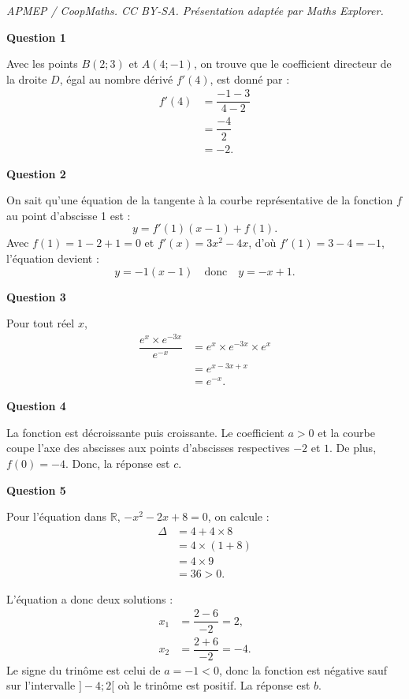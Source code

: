 \documentclass[10pt]{article}
\begin{document}
\noindent\textit{APMEP / CoopMaths. CC BY-SA. Présentation adaptée par Maths Explorer.}\par\medskip
\textbf{Question 1}
	
	Avec les points $B(2; 3)$ et $A(4; -1)$, on trouve que le coefficient directeur de la droite $D$, égal au nombre dérivé $f'(4)$, est donné par : 
	\begin{align*}
		f'(4) &= \dfrac{-1-3}{4-2} \\
		&= \dfrac{-4}{2} \\
		&= -2.
	\end{align*}
	
	\textbf{Question 2}
	
	On sait qu'une équation de la tangente à la courbe représentative de la fonction $f$ au point d'abscisse 1 est : 
	\[
	y  = f'(1)(x - 1)+f(1).
	\]
	Avec $f(1) = 1-2+1 = 0$ et $f'(x) = 3x^2 - 4x$, d'où $f'(1) = 3-4 = -1$, l'équation devient :
	\[
	y  = -1(x - 1) \quad \text{donc} \quad y = -x + 1.
	\]
	
	\textbf{Question 3}
	
	Pour tout réel $x$, 
	\begin{align*}
		\dfrac{e^x \times e^{-3x}}{e^{-x}} &= e^x \times e^{-3x} \times e^x \\
		&= e^{x - 3x + x} \\
		&= e^{-x}.
	\end{align*}
	
	\textbf{Question 4}
	
	La fonction est décroissante puis croissante. Le coefficient $a > 0$ et la courbe coupe l'axe des abscisses aux points d'abscisses respectives $-2$ et $1$. De plus, $f(0) = -4$. Donc, la réponse est $c$.
	
	\textbf{Question 5}
	
	Pour l'équation dans $\mathbb{R}$, $-x^2 - 2x + 8 = 0$, on calcule :
	\begin{align*}
		\Delta &= 4 + 4 \times 8 \\
		&= 4 \times (1 + 8) \\
		&= 4 \times 9 \\
		&= 36 > 0.
	\end{align*}
	
	L'équation a donc deux solutions :
	\begin{align*}
		x_1 &= \dfrac{2-6}{-2} = 2, \\
		x_2 &= \dfrac{2 + 6}{-2} = -4.
	\end{align*}
	Le signe du trinôme est celui de $a = -1 < 0$, donc la fonction est négative sauf sur l'intervalle $]-4; 2[$ où le trinôme est positif. La réponse est $b$.
\end{document}

